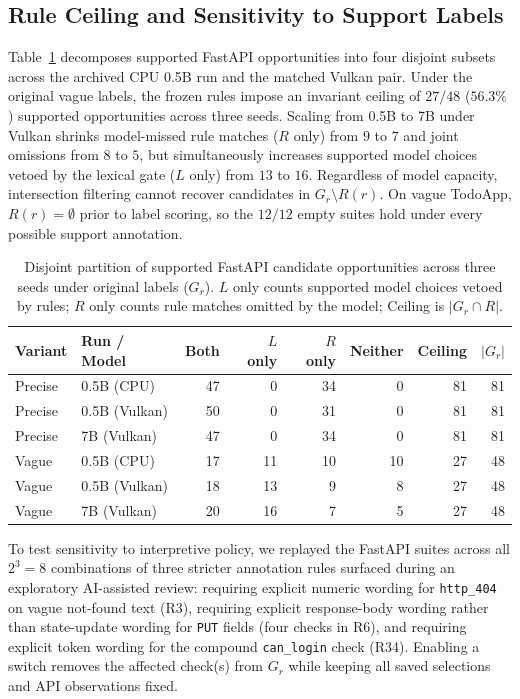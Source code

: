 \subsection{Rule Ceiling and Sensitivity to Support Labels}
Table~\ref{tab:partition} decomposes supported FastAPI opportunities into four disjoint subsets across the archived CPU 0.5B run and the matched Vulkan pair. Under the original vague labels, the frozen rules impose an invariant ceiling of $27/48$ ($56.3\%$) supported opportunities across three seeds. Scaling from 0.5B to 7B under Vulkan shrinks model-missed rule matches ($R$ only) from $9$ to $7$ and joint omissions from $8$ to $5$, but simultaneously increases supported model choices vetoed by the lexical gate ($L$ only) from $13$ to $16$. Regardless of model capacity, intersection filtering cannot recover candidates in $G_r\setminus R(r)$. On vague TodoApp, $R(r)=\emptyset$ prior to label scoring, so the $12/12$ empty suites hold under every possible support annotation.

\begin{table}[t]
\caption{Disjoint partition of supported FastAPI candidate opportunities across three seeds under original labels ($G_r$). $L$ only counts supported model choices vetoed by rules; $R$ only counts rule matches omitted by the model; Ceiling is $|G_r\cap R|$.}
\label{tab:partition}
\centering\small
\setlength{\tabcolsep}{3.0pt}
\begin{tabular}{llrrrrrr}
\toprule
Variant & Run / Model & Both & $L$ only & $R$ only & Neither & Ceiling & $|G_r|$\\
\midrule
Precise & 0.5B (CPU) & 47 & 0 & 34 & 0 & 81 & 81\\
Precise & 0.5B (Vulkan) & 50 & 0 & 31 & 0 & 81 & 81\\
Precise & 7B (Vulkan) & 47 & 0 & 34 & 0 & 81 & 81\\
\midrule
Vague & 0.5B (CPU) & 17 & 11 & 10 & 10 & 27 & 48\\
Vague & 0.5B (Vulkan) & 18 & 13 & 9 & 8 & 27 & 48\\
Vague & 7B (Vulkan) & 20 & 16 & 7 & 5 & 27 & 48\\
\bottomrule
\end{tabular}
\end{table}

To test sensitivity to interpretive policy, we replayed the FastAPI suites across all $2^3=8$ combinations of three stricter annotation rules surfaced during an exploratory AI-assisted review: requiring explicit numeric wording for \texttt{http\_404} on vague not-found text (R3), requiring explicit response-body wording rather than state-update wording for \texttt{PUT} fields (four checks in R6), and requiring explicit token wording for the compound \texttt{can\_login} check (R34). Enabling a switch removes the affected check(s) from $G_r$ while keeping all saved selections and API observations fixed.

